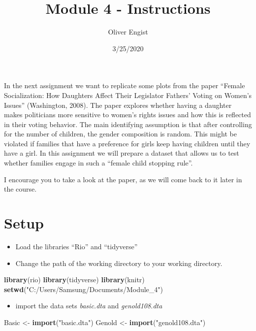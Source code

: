 \documentclass[
]{article}
\title{Module 4 - Instructions}
\author{Oliver Engist}
\date{3/25/2020}
\newenvironment{Shaded}{\begin{snugshade}}{\end{snugshade}}
\newcommand{\KeywordTok}[1]{\textcolor[rgb]{0.13,0.29,0.53}{\textbf{#1}}}
\newcommand{\NormalTok}[1]{#1}
\newcommand{\StringTok}[1]{\textcolor[rgb]{0.31,0.60,0.02}{#1}}
\providecommand{\tightlist}{%
  \setlength{\itemsep}{0pt}\setlength{\parskip}{0pt}}
\begin{document}
\maketitle

In the next assignment we want to replicate some plots from the paper
``Female Socialization: How Daughters Affect Their Legislator Fathers'
Voting on Women's Issues'' (Washington, 2008). The paper explores
whether having a daughter makes politicians more sensitive to women's
rights issues and how this is reflected in their voting behavior. The
main identifying assumption is that after controlling for the number of
children, the gender composition is random. This might be violated if
families that have a preference for girls keep having children until
they have a girl. In this assignment we will prepare a dataset that
allows us to test whether families engage in such a ``female child
stopping rule''.

I encourage you to take a look at the paper, as we will come back to it
later in the course.

\hypertarget{setup}{%
\section{Setup}\label{setup}}

\begin{itemize}
\tightlist
\item
  Load the libraries ``Rio'' and ``tidyverse''
\item
  Change the path of the working directory to your working directory.
\end{itemize}

\begin{Shaded}
\begin{Highlighting}[]
\KeywordTok{library}\NormalTok{(rio)}
\KeywordTok{library}\NormalTok{(tidyverse)}
\KeywordTok{library}\NormalTok{(knitr)}
\KeywordTok{setwd}\NormalTok{(}\StringTok{"C:/Users/Samsung/Documents/Module_4"}\NormalTok{)}
\end{Highlighting}
\end{Shaded}

\begin{itemize}
\tightlist
\item
  import the data sets \emph{basic.dta} and \emph{genold108.dta}
\end{itemize}

\begin{Shaded}
\begin{Highlighting}[]
\NormalTok{Basic <-}\StringTok{ }\KeywordTok{import}\NormalTok{(}\StringTok{"basic.dta"}\NormalTok{)}
\NormalTok{Genold <-}\StringTok{ }\KeywordTok{import}\NormalTok{(}\StringTok{"genold108.dta"}\NormalTok{)}
\end{Highlighting}
\end{Shaded}
\end{document}
